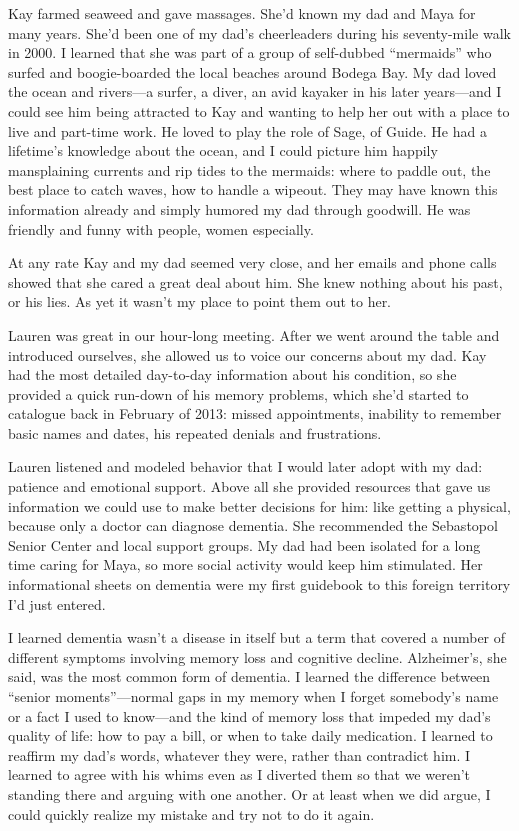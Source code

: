 \documentclass[12pt]{book}
\begin{document}
Kay farmed seaweed and gave massages. She'd known my dad and Maya for many years. She'd been one of my dad's cheerleaders during his seventy-mile walk in 2000. I learned that she was part of a group of self-dubbed ``mermaids'' who surfed and boogie-boarded the local beaches around Bodega Bay. My dad loved the ocean and rivers---a surfer, a diver, an avid kayaker in his later years---and I could see him being attracted to Kay and wanting to help her out with a place to live and part-time work. He loved to play the role of Sage, of Guide. He had a lifetime's knowledge about the ocean, and I could picture him happily mansplaining currents and rip tides to the mermaids: where to paddle out, the best place to catch waves, how to handle a wipeout. They may have known this information already and simply humored my dad through goodwill. He was friendly and funny with people, women especially.

At any rate Kay and my dad seemed very close, and her emails and phone calls showed that she cared a great deal about him. She knew nothing about his past, or his lies. As yet it wasn't my place to point them out to her.

Lauren was great in our hour-long meeting. After we went around the table and introduced ourselves, she allowed us to voice our concerns about my dad. Kay had the most detailed day-to-day information about his condition, so she provided a quick run-down of his memory problems, which she'd started to catalogue back in February of 2013: missed appointments, inability to remember basic names and dates, his repeated denials and frustrations.

Lauren listened and modeled behavior that I would later adopt with my dad: patience and emotional support. Above all she provided resources that gave us information we could use to make better decisions for him: like getting a physical, because only a doctor can diagnose dementia. She recommended the Sebastopol Senior Center and local support groups. My dad had been isolated for a long time caring for Maya, so more social activity would keep him stimulated. Her informational sheets on dementia were my first guidebook to this foreign territory I'd just entered.

I learned dementia wasn't a disease in itself but a term that covered a number of different symptoms involving memory loss and cognitive decline. Alzheimer's, she said, was the most common form of dementia. I learned the difference between ``senior moments''---normal gaps in my memory when I forget somebody's name or a fact I used to know---and the kind of memory loss that impeded my dad's quality of life: how to pay a bill, or when to take daily medication. I learned to reaffirm my dad's words, whatever they were, rather than contradict him. I learned to agree with his whims even as I diverted them so that we weren't standing there and arguing with one another. Or at least when we did argue, I could quickly realize my mistake and try not to do it again.
\end{document}
